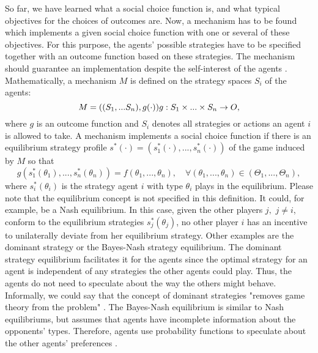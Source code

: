 So far, we have learned what a social choice function is, and what
typical objectives for the choices of outcomes are. Now, a
mechanism has to be found which implements a given social choice
function with one or several of these objectives. For this
purpose, the agents' possible strategies have to be specified
together with an outcome function based on these strategies. The
mechanism should guarantee an implementation despite the
self-interest of the agents \parencite{Pa01}. Mathematically, a
mechanism $M$ is defined on the strategy spaces $S_i$ of the
agents:
\begin{equation}\label{MechanismDefinition}
  M=((S_1,...S_n),g(\cdot))\\
  g:S_1\times...\times S_n\rightarrow O,
\end{equation}
where $g$ is an outcome function and $S_i$ denotes all strategies
or actions an agent $i$ is allowed to take. A mechanism implements
a social choice function if there is an equilibrium strategy
profile $s^\ast(\cdot)=(s^\ast_1(\cdot),...,s^\ast_n(\cdot))$ of
the game induced by $M$ so that
\begin{equation}\label{MechanismImplements}
    g(s^\ast_1(\theta_1),...,s^\ast_n(\theta_n))=f(\theta_1,...,\theta_n),
      \quad \forall
      (\theta_1,...,\theta_n)\in(\Theta_1,...,\Theta_n),
\end{equation}
where $s^\ast_i(\theta_i)$ is the strategy agent $i$ with type
$\theta_i$ plays in the equilibrium. Please note that the
equilibrium concept is not specified in this definition. It could,
for example, be a Nash equilibrium. In this case, given the other
players $j,$ $j \neq i$, conform to the equilibrium strategies
$s^\ast_j(\theta_j)$, no other player $i$ has an incentive to
unilaterally deviate from her equilibrium strategy. Other examples
are the dominant strategy or the Bayes-Nash strategy equilibrium.
The dominant strategy equilibrium facilitates it for the agents
since the optimal strategy for an agent is independent of any
strategies the other agents could play. Thus, the agents do not
need to speculate about the way the others might behave. Informally,
we could say that the concept of dominant strategies "removes game
theory from the problem" \textcite[p.~5]{Pa01}. The Bayes-Nash
equilibrium is similar to Nash equilibriums, but assumes that
agents have incomplete information about the opponents' types.
Therefore, agents use probability functions to speculate about the
other agents' preferences \parencite{OsRu94}.

